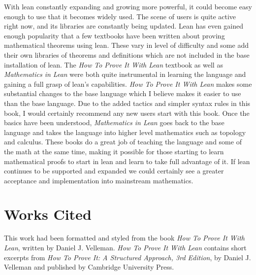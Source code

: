 \documentclass[
  letterpaper,
]{scrreprt}
\theoremstyle{remark}
\begin{document}
With lean constantly expanding and growing more powerful, it could
become easy enough to use that it becomes widely used. The scene of
users is quite active right now, and its libraries are constantly being
updated. Lean has even gained enough popularity that a few textbooks
have been written about proving mathematical theorems using lean. These
vary in level of difficulty and some add their own libraries of theorems
and definitions which are not included in the base installation of lean.
The \emph{How To Prove It With Lean} textbook as well as
\emph{Mathematics in Lean} were both quite instrumental in learning the
language and gaining a full grasp of lean's capabilities. \emph{How To
Prove It With Lean} makes some substantial changes to the base language
which I believe makes it easier to use than the base language. Due to
the added tactics and simpler syntax rules in this book, I would
certainly recommend any new users start with this book. Once the basics
have been understood, \emph{Mathematics in Lean} goes back to the base
language and takes the language into higher level mathematics such as
topology and calculus. These books do a great job of teaching the
language and some of the math at the same time, making it possible for
those starting to learn mathematical proofs to start in lean and learn
to take full advantage of it. If lean continues to be supported and
expanded we could certainly see a greater acceptance and implementation
into mainstream mathematics.


\hypertarget{works-cited}{%
\chapter{Works Cited}\label{works-cited}}

This work had been formatted and styled from the book \emph{How To Prove
It With Lean}, written by Daniel J. Velleman. \emph{How To Prove It With
Lean} contains short excerpts from \emph{How To Prove It: A Structured
Approach, 3rd Edition}, by Daniel J. Velleman and published by Cambridge
University Press.
\end{document}
